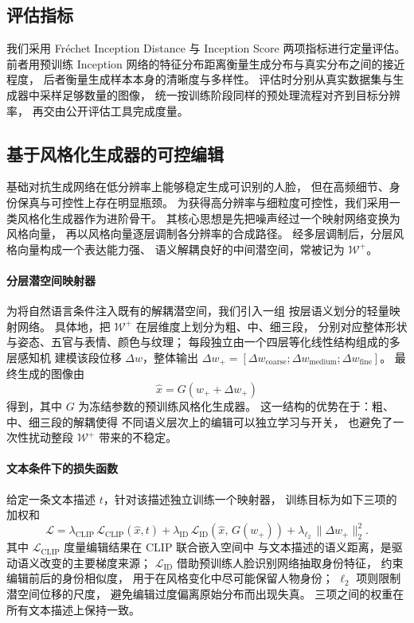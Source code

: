 \documentclass[11pt,a4paper]{ctexart}
\begin{document}
\subsection{评估指标}
我们采用 Fr\'echet Inception Distance 与 Inception Score 两项指标进行定量评估。
前者用预训练 Inception 网络的特征分布距离衡量生成分布与真实分布之间的接近程度，
后者衡量生成样本本身的清晰度与多样性。
评估时分别从真实数据集与生成器中采样足够数量的图像，
统一按训练阶段同样的预处理流程对齐到目标分辨率，
再交由公开评估工具完成度量。

\subsection{基于风格化生成器的可控编辑}
基础对抗生成网络在低分辨率上能够稳定生成可识别的人脸，
但在高频细节、身份保真与可控性上存在明显瓶颈。
为获得高分辨率与细粒度可控性，我们采用一类风格化生成器作为进阶骨干。
其核心思想是先把噪声经过一个映射网络变换为风格向量，
再以风格向量逐层调制各分辨率的合成路径。
经多层调制后，分层风格向量构成一个表达能力强、
语义解耦良好的中间潜空间，常被记为 $\mathcal W^+$。

\paragraph{分层潜空间映射器}
为将自然语言条件注入既有的解耦潜空间，我们引入一组
按层语义划分的轻量映射网络。
具体地，把 $\mathcal W^+$ 在层维度上划分为粗、中、细三段，
分别对应整体形状与姿态、五官与表情、颜色与纹理；
每段独立由一个四层等化线性结构组成的多层感知机
建模该段位移 $\Delta w$，整体输出
$\Delta w_+=[\Delta w_\mathrm{coarse};\Delta w_\mathrm{medium};\Delta w_\mathrm{fine}]$。
最终生成的图像由
\begin{equation}
\hat x = G(w_+ + \Delta w_+)
\end{equation}
得到，其中 $G$ 为冻结参数的预训练风格化生成器。
这一结构的优势在于：粗、中、细三段的解耦使得
不同语义层次上的编辑可以独立学习与开关，
也避免了一次性扰动整段 $\mathcal W^+$ 带来的不稳定。

\paragraph{文本条件下的损失函数}
给定一条文本描述 $t$，针对该描述独立训练一个映射器，
训练目标为如下三项的加权和
\begin{equation}
\mathcal L = \lambda_\mathrm{CLIP}\,\mathcal L_\mathrm{CLIP}\!\left(\hat x, t\right)
+ \lambda_\mathrm{ID}\,\mathcal L_\mathrm{ID}\!\left(\hat x,\, G(w_+)\right)
+ \lambda_{\ell_2}\,\|\Delta w_+\|_2^2.
\end{equation}
其中 $\mathcal L_\mathrm{CLIP}$ 度量编辑结果在 CLIP 联合嵌入空间中
与文本描述的语义距离，是驱动语义改变的主要梯度来源；
$\mathcal L_\mathrm{ID}$ 借助预训练人脸识别网络抽取身份特征，
约束编辑前后的身份相似度，
用于在风格变化中尽可能保留人物身份；
$\ell_2$ 项则限制潜空间位移的尺度，
避免编辑过度偏离原始分布而出现失真。
三项之间的权重在所有文本描述上保持一致。
\end{document}
